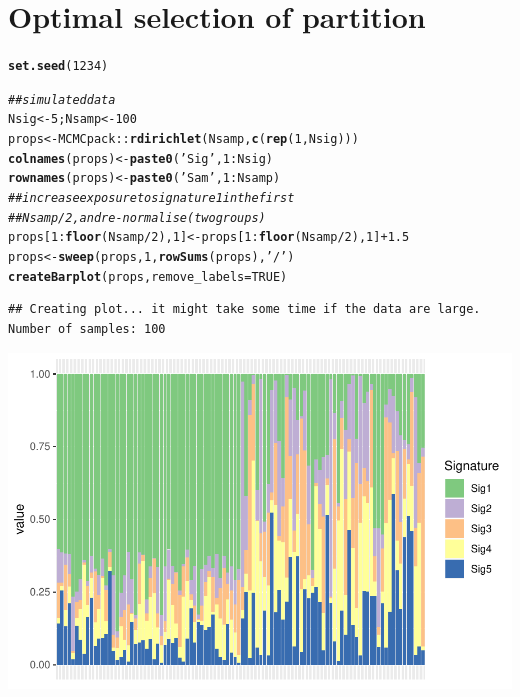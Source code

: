 \documentclass{article}\usepackage[]{graphicx}\usepackage[]{color}
\makeatletter
\def\maxwidth{ %
  \ifdim\Gin@nat@width>\linewidth
    \linewidth
  \else
    \Gin@nat@width
  \fi
}
\newcommand{\hlnum}[1]{\textcolor[rgb]{0.686,0.059,0.569}{#1}}%
\newcommand{\hlstr}[1]{\textcolor[rgb]{0.192,0.494,0.8}{#1}}%
\newcommand{\hlcom}[1]{\textcolor[rgb]{0.678,0.584,0.686}{\textit{#1}}}%
\newcommand{\hlopt}[1]{\textcolor[rgb]{0,0,0}{#1}}%
\newcommand{\hlstd}[1]{\textcolor[rgb]{0.345,0.345,0.345}{#1}}%
\newcommand{\hlkwb}[1]{\textcolor[rgb]{0.69,0.353,0.396}{#1}}%
\newcommand{\hlkwc}[1]{\textcolor[rgb]{0.333,0.667,0.333}{#1}}%
\newcommand{\hlkwd}[1]{\textcolor[rgb]{0.737,0.353,0.396}{\textbf{#1}}}%
\newenvironment{kframe}{%
 \def\at@end@of@kframe{}%
 \ifinner\ifhmode%
  \def\at@end@of@kframe{\end{minipage}}%
  \begin{minipage}{\columnwidth}%
 \fi\fi%
 \def\FrameCommand##1{\hskip\@totalleftmargin \hskip-\fboxsep
 \colorbox{shadecolor}{##1}\hskip-\fboxsep
     \hskip-\linewidth \hskip-\@totalleftmargin \hskip\columnwidth}%
 \MakeFramed {\advance\hsize-\width
   \@totalleftmargin\z@ \linewidth\hsize
   \@setminipage}}%
 {\par\unskip\endMakeFramed%
 \at@end@of@kframe}
\newenvironment{knitrout}{}{} %
\makeatother
\begin{document}
\section{Optimal selection of partition}

\begin{knitrout}
\color{fgcolor}\begin{kframe}
\begin{alltt}
\hlkwd{set.seed}\hlstd{(}\hlnum{1234}\hlstd{)}

\hlcom{## simulated data}
\hlstd{Nsig} \hlkwb{<-} \hlnum{5}\hlstd{; Nsamp} \hlkwb{<-} \hlnum{100}
\hlstd{props} \hlkwb{<-} \hlstd{MCMCpack}\hlopt{::}\hlkwd{rdirichlet}\hlstd{(Nsamp,} \hlkwd{c}\hlstd{(}\hlkwd{rep}\hlstd{(}\hlnum{1}\hlstd{,Nsig)))}
\hlkwd{colnames}\hlstd{(props)} \hlkwb{<-} \hlkwd{paste0}\hlstd{(}\hlstr{'Sig'}\hlstd{,} \hlnum{1}\hlopt{:}\hlstd{Nsig)}
\hlkwd{rownames}\hlstd{(props)} \hlkwb{<-} \hlkwd{paste0}\hlstd{(}\hlstr{'Sam '}\hlstd{,} \hlnum{1}\hlopt{:}\hlstd{Nsamp)}
\hlcom{## increase exposure to signature 1 in the first}
\hlcom{## Nsamp/2, and re-normalise (two groups)}
\hlstd{props[}\hlnum{1}\hlopt{:}\hlkwd{floor}\hlstd{(Nsamp}\hlopt{/}\hlnum{2}\hlstd{),} \hlnum{1}\hlstd{]} \hlkwb{<-} \hlstd{props[}\hlnum{1}\hlopt{:}\hlkwd{floor}\hlstd{(Nsamp}\hlopt{/}\hlnum{2}\hlstd{),} \hlnum{1}\hlstd{]} \hlopt{+} \hlnum{1.5}
\hlstd{props} \hlkwb{<-} \hlkwd{sweep}\hlstd{(props,} \hlnum{1}\hlstd{,} \hlkwd{rowSums}\hlstd{(props),} \hlstr{'/'}\hlstd{)}
\hlkwd{createBarplot}\hlstd{(props,} \hlkwc{remove_labels} \hlstd{=} \hlnum{TRUE}\hlstd{)}
\end{alltt}
\begin{verbatim}
## Creating plot... it might take some time if the data are large. Number of samples: 100
\end{verbatim}
\end{kframe}
\includegraphics[width=\maxwidth]{figure/unnamed-chunk-15-1} 

\end{knitrout}
\end{document}

